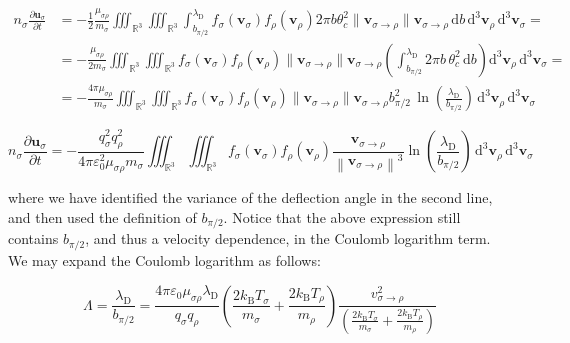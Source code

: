 \begin{align*}
    n_\sigma\frac{\partial \mathbf{u}_\sigma}{\partial t}&=-\frac{1}{2}\frac{\mu_{\sigma\rho}}{m_\sigma}\iiint_{\mathbb{R}^3}\iiint_{\mathbb{R}^3}\int_{b_{\pi/2}}^{\lambda_{\mathrm{D}}}f_\sigma(\mathbf{v}_\sigma)f_\rho(\mathbf{v}_\rho)2\pi b\theta_c^2\|\mathbf{v}_{\sigma\to\rho}\|\mathbf{v}_{\sigma\to\rho}\,\mathrm{d}b\,\mathrm{d^3}\mathbf{v}_\rho\,\mathrm{d^3}\mathbf{v}_\sigma=\\
    &=-\frac{\mu_{\sigma\rho}}{2m_\sigma}\iiint_{\mathbb{R}^3}\iiint_{\mathbb{R}^3}f_\sigma(\mathbf{v}_\sigma)f_\rho(\mathbf{v}_\rho)\|\mathbf{v}_{\sigma\to\rho}\|\mathbf{v}_{\sigma\to\rho}\left(\int_{b_{\pi/2}}^{\lambda_{\mathrm{D}}}2\pi b\,\theta_c^2\,\mathrm{d}b\right)\mathrm{d^3}\mathbf{v}_\rho\,\mathrm{d^3}\mathbf{v}_\sigma=\\
    &=-\frac{4\pi\mu_{\sigma\rho}}{m_\sigma}\iiint_{\mathbb{R}^3}\iiint_{\mathbb{R}^3}f_\sigma(\mathbf{v}_\sigma)f_\rho(\mathbf{v}_\rho)\|\mathbf{v}_{\sigma\to\rho}\|\mathbf{v}_{\sigma\to\rho}b_{\pi/2}^2\,\ln{\left(\frac{\lambda_{\mathrm{D}}}{b_{\pi/2}}\right)}\,\mathrm{d^3}\mathbf{v}_\rho\,\mathrm{d^3}\mathbf{v}_\sigma
\end{align*}

\begin{equation}
    \label{eq-1-18-coll}
    n_\sigma \frac{\partial \mathbf{u}_\sigma}{\partial t}=-\frac{q_\sigma^2 q_\rho^2}{4\pi \varepsilon_0^2\mu_{\sigma\rho}m_\sigma}\iiint_{\mathbb{R}^3}\iiint_{\mathbb{R}^3}f_\sigma(\mathbf{v}_\sigma)f_\rho(\mathbf{v}_\rho)\frac{\mathbf{v}_{\sigma\to\rho}}{\left\|\mathbf{v}_{\sigma\to\rho}\right\|^3}\ln{\left(\frac{\lambda_{\mathrm{D}}}{b_{\pi/2}}\right)}\,\mathrm{d^3}\mathbf{v}_\rho\,\mathrm{d^3}\mathbf{v}_\sigma
\end{equation}

where we have identified the variance of the deflection angle in the second line, and then used the definition of $b_{\pi/2}$. Notice that the above expression still contains $b_{\pi/2}$, and thus a velocity dependence, in the Coulomb logarithm term. We may expand the Coulomb logarithm as follows:

\begin{equation*}
    \Lambda=\frac{\lambda_{\mathrm{D}}}{b_{\pi/2}}=\frac{4\pi \varepsilon_0\mu_{\sigma\rho}\lambda_{\mathrm{D}}}{q_\sigma q_\rho}\left(\frac{2k_\text{B}T_\sigma}{m_\sigma}+\frac{2k_\text{B}T_\rho}{m_\rho}\right)\frac{v_{\sigma\to\rho}^2}{\left(\frac{2k_\text{B}T_\sigma}{m_\sigma}+\frac{2k_\text{B}T_\rho}{m_\rho}\right)}
\end{equation*}

